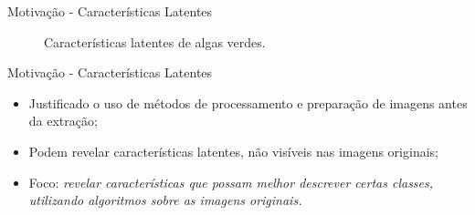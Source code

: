 \documentclass{beamer}
\begin{document}
\begin{frame}{Motivação - Características Latentes}
\begin{figure}[htbp]
\begin{center}
  \caption{Características latentes de algas verdes.}
 \end{center}
\end{figure}
\renewcommand{\tabcolsep}{0.25cm}
\end{frame}
\begin{frame}{Motivação - Características Latentes}
\setlength\leftmargini{0em}
\justifying
{}
\begin{itemize}
\item Justificado o uso de métodos de processamento e preparação de imagens antes da extração;
\item Podem revelar características latentes, não visíveis nas imagens originais;
\item Foco: \emph{revelar características que possam melhor descrever certas classes, utilizando algoritmos sobre as imagens originais.}
\end{itemize}
\end{frame}
\end{document}
